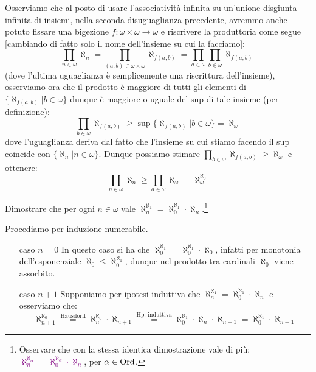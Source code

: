 \begin{remark}
	Osserviamo che al posto di usare l'associatività infinita su un'unione disgiunta infinita di insiemi, nella seconda disuguaglianza precedente, avremmo anche potuto fissare una bigezione $f : \omega \times \omega \to \omega$
	e riscrivere la produttoria come segue [cambiando di fatto solo il nome dell'insieme su cui la facciamo]:
	\[ \prod_{n \in \omega} \aleph_n = \prod_{(a,b)\in \omega \times \omega} \aleph_{f(a,b)} = \prod_{a \in \omega} \prod_{b \in \omega} \aleph_{f(a,b)}
		\]
	(dove l'ultima uguaglianza è semplicemente una riscrittura dell'insieme), osserviamo ora che il prodotto è maggiore di tutti gli elementi di $\{\aleph_{f(a,b)} | b \in \omega\}$ dunque è maggiore o uguale del sup di tale insieme (per definizione):
	\[ \prod_{b \in \omega} \aleph_{f(a,b)} \geq \sup\{\aleph_{f(a,b)} | b \in \omega\} = \aleph_\omega
		\]
	dove l'uguaglianza deriva dal fatto che l'insieme su cui stiamo facendo il sup coincide con $\{\aleph_n | n \in \omega\}$. Dunque possiamo stimare $\prod_{b \in \omega} \aleph_{f(a,b)} \geq \aleph_\omega$ e ottenere:
	\[ \prod_{n \in \omega} \aleph_n \geq \prod_{a \in \omega} \aleph_\omega = \aleph_\omega^{\aleph_0}
		\]
\end{remark}

\begin{exercise}[$\aleph_n^{\aleph_1} = \aleph_0^{\aleph_1}\cdot \aleph_n$]
	Dimostrare che per ogni $n \in \omega$ vale $\aleph_n^{\aleph_1} = \aleph_0^{\aleph_1}\cdot \aleph_n$.\footnote{Osservare che con la stessa identica dimostrazione vale di più: \textcolor{purple}{$\aleph_n^{\aleph_\alpha} = \aleph_0^{\aleph_\alpha} \cdot \aleph_n$}, per $\alpha \in \operatorname{Ord}$.}
\end{exercise}

\begin{soln}
	Procediamo per induzione numerabile.
	\begin{itemize}
		\item[$\boxed{\text{caso $n = 0$}}$] In questo caso si ha che $\aleph_0^{\aleph_1} = \aleph_0^{\aleph_1} \cdot \aleph_0$, infatti per monotonia dell'esponenziale $\aleph_0 \leq \aleph_0^{\aleph_1}$, dunque nel prodotto tra cardinali $\aleph_0$ viene assorbito.
		\item[$\boxed{\text{caso $n + 1$}}$] Supponiamo per ipotesi induttiva che $\aleph_n^{\aleph_1} = \aleph_0^{\aleph_1}\cdot \aleph_n$ e osserviamo che:
		\[ \aleph_{n+1}^{\aleph_0} \overset{\text{Hausdorff}}{=} \aleph_n^{\aleph_0} \cdot \aleph_{n+1} \overset{\text{Hp. induttiva}}{=} \aleph_0^{\aleph_1}\cdot \aleph_n \cdot \aleph_{n+1} = \aleph_0^{\aleph_1} \cdot \aleph_{n+1}
			\]
	\end{itemize}
\end{soln}

